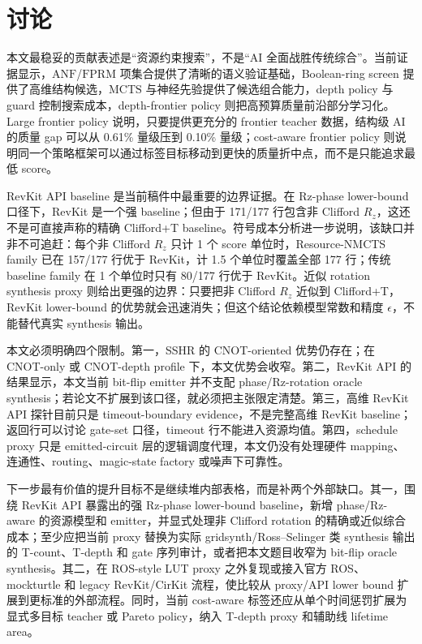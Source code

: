 \documentclass[UTF8,fontset=macnew,11pt]{ctexart}
\newcommand{\screen}{Boolean-ring screen}
\newcommand{\anf}{\ensuremath{\mathrm{ANF}}}
\newcommand{\fprm}{\ensuremath{\mathrm{FPRM}}}
\newcommand{\mcts}{\ensuremath{\mathrm{MCTS}}}
\begin{document}
\section{讨论}

本文最稳妥的贡献表述是“资源约束搜索”，不是“AI 全面战胜传统综合”。当前证据显示，\anf{}/\fprm{} 项集合提供了清晰的语义验证基础，\screen{} 提供了高维结构候选，\mcts{} 与神经先验提供了候选组合能力，depth policy 与 guard 控制搜索成本，depth-frontier policy 则把高预算质量前沿部分学习化。Large frontier policy 说明，只要提供更充分的 frontier teacher 数据，结构级 AI 的质量 gap 可以从 0.61\% 量级压到 0.10\% 量级；cost-aware frontier policy 则说明同一个策略框架可以通过标签目标移动到更快的质量折中点，而不是只能追求最低 score。

RevKit API baseline 是当前稿件中最重要的边界证据。在 Rz-phase lower-bound 口径下，RevKit 是一个强 baseline；但由于 171/177 行包含非 Clifford $R_z$，这还不是可直接声称的精确 Clifford+T baseline。符号成本分析进一步说明，该缺口并非不可追赶：每个非 Clifford $R_z$ 只计 1 个 score 单位时，Resource-NMCTS family 已在 157/177 行优于 RevKit，计 1.5 个单位时覆盖全部 177 行；传统 baseline family 在 1 个单位时只有 80/177 行优于 RevKit。近似 rotation synthesis proxy 则给出更强的边界：只要把非 Clifford $R_z$ 近似到 Clifford+T，RevKit lower-bound 的优势就会迅速消失；但这个结论依赖模型常数和精度 $\epsilon$，不能替代真实 synthesis 输出。

本文必须明确四个限制。第一，SSHR 的 CNOT-oriented 优势仍存在；在 CNOT-only 或 CNOT-depth profile 下，本文优势会收窄。第二，RevKit API 的结果显示，本文当前 bit-flip emitter 并不支配 phase/Rz-rotation oracle synthesis；若论文不扩展到该口径，就必须把主张限定清楚。第三，高维 RevKit API 探针目前只是 timeout-boundary evidence，不是完整高维 RevKit baseline；返回行可以讨论 gate-set 口径，timeout 行不能进入资源均值。第四，schedule proxy 只是 emitted-circuit 层的逻辑调度代理，本文仍没有处理硬件 mapping、连通性、routing、magic-state factory 或噪声下可靠性。

下一步最有价值的提升目标不是继续堆内部表格，而是补两个外部缺口。其一，围绕 RevKit API 暴露出的强 Rz-phase lower-bound baseline，新增 phase/Rz-aware 的资源模型和 emitter，并显式处理非 Clifford rotation 的精确或近似综合成本；至少应把当前 proxy 替换为实际 gridsynth/Ross--Selinger 类 synthesis 输出的 T-count、T-depth 和 gate 序列审计，或者把本文题目收窄为 bit-flip oracle synthesis。其二，在 ROS-style LUT proxy 之外复现或接入官方 ROS、mockturtle 和 legacy RevKit/CirKit 流程，使比较从 proxy/API lower bound 扩展到更标准的外部流程。同时，当前 cost-aware 标签还应从单个时间惩罚扩展为显式多目标 teacher 或 Pareto policy，纳入 T-depth proxy 和辅助线 lifetime area。
\end{document}
